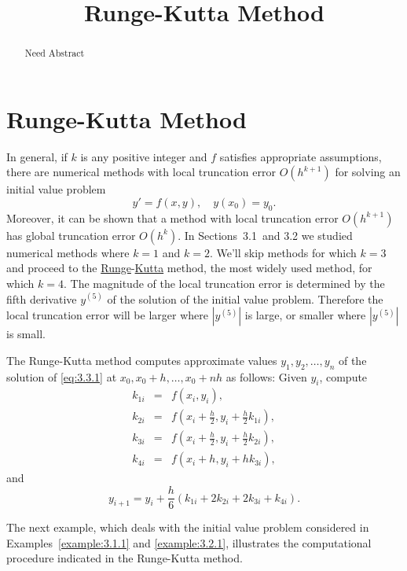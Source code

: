 \documentclass{ximera}
\title{Runge-Kutta Method}
\begin{document}

\begin{abstract}
Need Abstract
\end{abstract}

\maketitle

\section*{Runge-Kutta Method}

In general, if $k$ is any  positive  integer  and $f$
satisfies appropriate assumptions, there are numerical methods with
local truncation error  $O(h^{k+1})$ for solving an initial value
problem
\begin{equation} \label{eq:3.3.1}
y'=f(x,y),\quad y(x_0)=y_0.
\end{equation}
Moreover, it can be shown that a method with local truncation error
$O(h^{k+1})$ has global truncation error $O(h^k)$. In
Sections~3.1\ and 3.2 we studied numerical
methods where
$k=1$ and $k=2$. We'll skip methods for which $k=3$ and proceed to the
\href{http://www-history.mcs.st-and.ac.uk/Mathematicians/Runge.html}
{Runge}-\href{http://www-history.mcs.st-and.ac.uk/Mathematicians/Kutta.html}{Kutta} method, the most widely used
method, for which $k=4$. The magnitude of the local truncation error is
determined by the fifth derivative $y^{(5)}$ of the solution of the
initial value problem. Therefore the local truncation error will be
larger where $|y^{(5)}|$ is large, or smaller where $|y^{(5)}|$ is
small.

The Runge-Kutta method computes approximate values
$y_1, y_2, \dots, y_n$ of the solution of \eqref{eq:3.3.1}
at $x_0, x_0+h, \dots, x_0+nh$ as follows: Given $y_i$,
compute
\begin{eqnarray*} k_{1i}&=&f(x_i,y_i),\\
k_{2i}&=&f\left(x_i+\frac{h}{2},y_i+\frac{h}{2}k_{1i}\right),\\
k_{3i}&=&f\left(x_i+\frac{h}{2},y_i+\frac{h}{2}k_{2i}\right),\\
k_{4i}&=&f(x_i+h,y_i+hk_{3i}),
\end{eqnarray*}
and
$$
y_{i+1}=y_i+\frac{h}{6}(k_{1i}+2k_{2i}+2k_{3i}+k_{4i}).
$$

 The next example, which deals with the initial value problem
considered in Examples~\ref{example:3.1.1} and \ref{example:3.2.1},
illustrates
the computational procedure indicated in the Runge-Kutta method.
\end{document}
